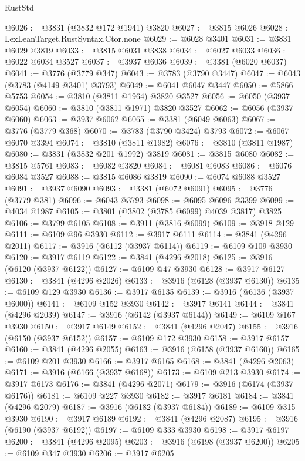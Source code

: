 \begin{lexlean}{RustStd}
\begin{coremodule}
@6026 := @3831 (@3832 @172 @1941) @3820
@6027 := @3815 @6026
@6028 := LexLeanTarget.RustSyntax.Ctor.none
@6029 := @6028 @3401
@6031 := @3831 @6029 @3819
@6033 := @3815 @6031 @3838
@6034 := @6027 @6033
@6036 := @6022 @6034 @3527
@6037 := @3937 @6036
@6039 := @3381 (@6020 @6037)
@6041 := @3776 (@3779 @347)
@6043 := @3783 (@3790 @3447)
@6047 := @6043 (@3783 (@4149 @3401) @3793)
@6049 := @6041 @6047 @3447
@6050 := @5866 @5753
@6054 := @3810 (@3811 @1964) @3820 @3527
@6056 := @6050 (@3937 @6054)
@6060 := @3810 (@3811 @1971) @3820 @3527
@6062 := @6056 (@3937 @6060)
@6063 := @3937 @6062
@6065 := @3381 (@6049 @6063)
@6067 := @3776 (@3779 @368)
@6070 := @3783 (@3790 @3424) @3793
@6072 := @6067 @6070 @3394
@6074 := @3810 (@3811 @1982)
@6076 := @3810 (@3811 @1987)
@6080 := @3831 (@3832 @201 @1992) @3819
@6081 := @3815 @6080
@6082 := @3815 @5761
@6083 := @6082 @3820
@6084 := @6081 @6083
@6086 := @6076 @6084 @3527
@6088 := @3815 @6086 @3819
@6090 := @6074 @6088 @3527
@6091 := @3937 @6090
@6093 := @3381 (@6072 @6091)
@6095 := @3776 (@3779 @381)
@6096 := @6043 @3793
@6098 := @6095 @6096 @3399
@6099 := @4034 @1987
@6105 := @3801 (@3802 (@3785 @6099) @4039 @3817) @3825
@6106 := @3799 @6105
@6108 := @3911 (@3816 @6099)
@6109 := @3918 @129
@6111 := @6109 @96 @3930
@6112 := @3917 @6111
@6114 := @3841 (@4296 @2011)
@6117 := @3916 (@6112 (@3937 @6114))
@6119 := @6109 @109 @3930
@6120 := @3917 @6119
@6122 := @3841 (@4296 @2018)
@6125 := @3916 (@6120 (@3937 @6122))
@6127 := @6109 @47 @3930
@6128 := @3917 @6127
@6130 := @3841 (@4296 @2026)
@6133 := @3916 (@6128 (@3937 @6130))
@6135 := @6109 @129 @3930
@6136 := @3917 @6135
@6139 := @3916 (@6136 (@3937 @6000))
@6141 := @6109 @152 @3930
@6142 := @3917 @6141
@6144 := @3841 (@4296 @2039)
@6147 := @3916 (@6142 (@3937 @6144))
@6149 := @6109 @167 @3930
@6150 := @3917 @6149
@6152 := @3841 (@4296 @2047)
@6155 := @3916 (@6150 (@3937 @6152))
@6157 := @6109 @172 @3930
@6158 := @3917 @6157
@6160 := @3841 (@4296 @2055)
@6163 := @3916 (@6158 (@3937 @6160))
@6165 := @6109 @201 @3930
@6166 := @3917 @6165
@6168 := @3841 (@4296 @2063)
@6171 := @3916 (@6166 (@3937 @6168))
@6173 := @6109 @213 @3930
@6174 := @3917 @6173
@6176 := @3841 (@4296 @2071)
@6179 := @3916 (@6174 (@3937 @6176))
@6181 := @6109 @227 @3930
@6182 := @3917 @6181
@6184 := @3841 (@4296 @2079)
@6187 := @3916 (@6182 (@3937 @6184))
@6189 := @6109 @315 @3930
@6190 := @3917 @6189
@6192 := @3841 (@4296 @2087)
@6195 := @3916 (@6190 (@3937 @6192))
@6197 := @6109 @333 @3930
@6198 := @3917 @6197
@6200 := @3841 (@4296 @2095)
@6203 := @3916 (@6198 (@3937 @6200))
@6205 := @6109 @347 @3930
@6206 := @3917 @6205

\end{coremodule}
\end{lexlean}
